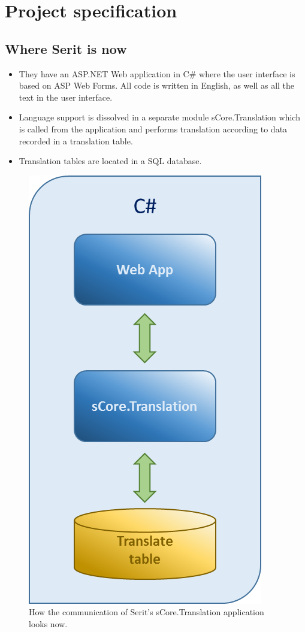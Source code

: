 \documentclass[12pt, a4paper]{article}
\begin{document}
\newpage
\section{Project specification }

\subsection{Where Serit is now}

\begin{itemize}
	\item They have an ASP.NET Web application in C\# where the user interface is based on ASP Web Forms. All code is written in English, as well as all the text in the user interface.
	\item Language support is dissolved in a separate module sCore.Translation which is called from the application and performs translation according to data recorded in a translation table.
	\item Translation tables are located in a SQL database.

\end{itemize}

\begin{figure}[!h]
    \includegraphics[scale=0.4]{image00}
    \centering
    \caption{How the communication of Serit's sCore.Translation application looks now.}
\end{figure}
\end{document}
